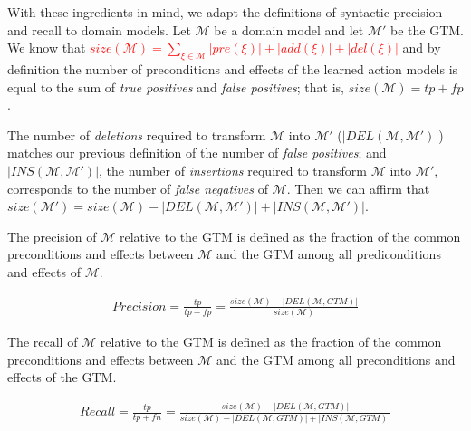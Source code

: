 With these ingredients in mind, we adapt the definitions of syntactic precision and recall to domain models. Let $\mathcal{M}$ be a domain model and let $\mathcal{M'}$ be the GTM. We know that \textcolor{red}{$size(\mathcal{M}) = \sum_{\xi \in \mathcal{M}}\left|pre(\xi)\right| + \left|add(\xi)\right| + \left|del(\xi)\right|$} and by definition the number of preconditions and effects of the learned action models is equal to the sum of {\em true positives} and {\em false positives}; that is, $size(\mathcal{M}) = tp + fp$.

The number of \emph{deletions} required to transform $\mathcal{M}$ into $\mathcal{M'}$ ($\left|DEL(\mathcal{M},\mathcal{M'})\right|$) matches our previous definition of the number of {\em false positives}; and $\left|INS(\mathcal{M},\mathcal{M'})\right|$, the number of \emph{insertions} required to transform $\mathcal{M}$ into $\mathcal{M'}$, corresponds to the number of {\em false negatives} of $\mathcal{M}$. Then we can affirm that $size(\mathcal{M'}) = size(\mathcal{M}) - \left|DEL(\mathcal{M},\mathcal{M'})\right| + \left|INS(\mathcal{M},\mathcal{M'})\right|$.

\begin{mydefinition} \label{syn-precision} The precision of $\mathcal{M}$ relative to the GTM is defined as the fraction of the common preconditions and effects between $\mathcal{M}$ and the GTM among all prediconditions and effects of $\mathcal{M}$. 
	\begin{small}
		\begin{align*}
		Precision=\frac{tp}{tp+fp}=\frac{size(\mathcal{M})- \left|DEL(\mathcal{M},GTM)\right|}{size(\mathcal{M})}
		\end{align*}
	\end{small}
\end{mydefinition}



\begin{mydefinition} \label{syn-recall} The recall of $\mathcal{M}$ relative to the GTM is defined as the fraction of the common preconditions and effects between $\mathcal{M}$ and the GTM among all preconditions and effects of the GTM. 
	
	\begin{small}
		\begin{align*}
		Recall= \frac{tp}{tp+fn}=
		\frac{size(\mathcal{M})- \left|DEL(\mathcal{M},GTM)\right|}{size(\mathcal{M}) - \left|DEL(\mathcal{M},GTM)\right| + \left|INS(\mathcal{M},GTM)\right|}
		\end{align*}
	\end{small}
\end{mydefinition}

